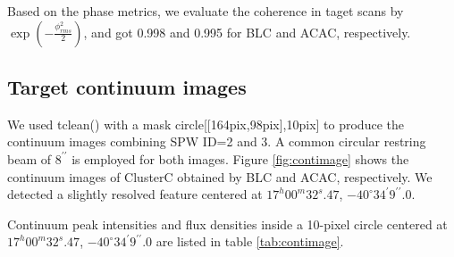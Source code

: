 \documentclass[a4paper, 10pt]{scrartcl}
\begin{document}
Based on the phase metrics, we evaluate the coherence in taget scans by $\exp \left( -\frac{\phi^2_{rms} }{2} \right)$, and got 0.998 and 0.995 for BLC and ACAC, respectively.

\subsection{Target continuum images}\label{subsec:contimages}
We used tclean() with a mask
circle[[164pix,98pix],10pix] 
to produce the continuum images combining SPW ID=2 and 3.
A common circular restring beam of $8^{\prime \prime}$ is employed for both images.
Figure \ref{fig:contimage} shows the continuum images of ClusterC obtained by BLC and ACAC, respectively. We detected a slightly resolved feature centered at $17^h 00^m 32^s.47$, $-40^{\circ} 34^{\prime} 9^{\prime \prime}.0$.

Continuum peak intensities and flux densities inside a 10-pixel circle centered at $17^h 00^m 32^s.47$, $-40^{\circ} 34^{\prime} 9^{\prime \prime}.0$ are listed in table \ref{tab:contimage}.
\end{document}
